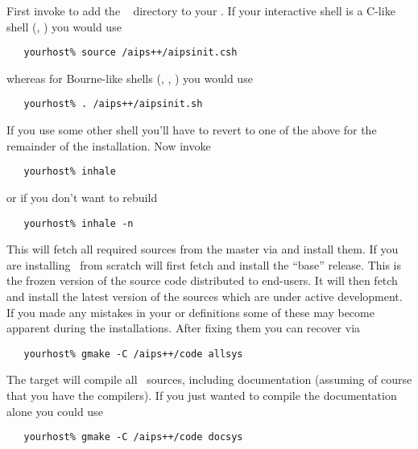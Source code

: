 First invoke  to add the \aipspp\  directory to
your .  If your interactive shell is a C-like shell (,
) you would use

\begin{verbatim}
   yourhost% source /aips++/aipsinit.csh
\end{verbatim}

\noindent
whereas for Bourne-like shells (, , )
you would use

\begin{verbatim}
   yourhost% . /aips++/aipsinit.sh
\end{verbatim}

\noindent
If you use some other shell you'll have to revert to one of the above for the
remainder of the installation.  Now invoke 

\begin{verbatim}
   yourhost% inhale
\end{verbatim}

\noindent
or if you don't want to rebuild

\begin{verbatim}
   yourhost% inhale -n
\end{verbatim}

\noindent
This will fetch all required sources from the master via  and
install them.  If you are installing \aipspp\ from scratch 
will first fetch and install the ``base'' release.  This is the frozen version
of the source code distributed to end-users.  It will then fetch and install
the latest version of the sources which are under active development.  If you
made any mistakes in your  or  definitions some of
these may become apparent during the installations.  After fixing them you can
recover via

\begin{verbatim}
   yourhost% gmake -C /aips++/code allsys
\end{verbatim}

\noindent
The  target will compile all \aipspp\ sources, including
documentation (assuming of course that you have the compilers).  If you just
wanted to compile the documentation alone you could use

\begin{verbatim}
   yourhost% gmake -C /aips++/code docsys
\end{verbatim}

